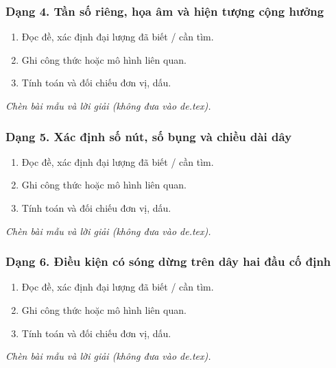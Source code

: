 \subsubsection{Dạng 4. Tần số riêng, họa âm và hiện tượng cộng hưởng}
\begin{phuongphap}
\begin{enumerate}
\item Đọc đề, xác định đại lượng đã biết / cần tìm.
\item Ghi công thức hoặc mô hình liên quan.
\item Tính toán và đối chiếu đơn vị, dấu.
\end{enumerate}
\end{phuongphap}
\begin{vidumau}
\textit{Chèn bài mẫu và lời giải (không đưa vào de.tex).}
\end{vidumau}

\subsubsection{Dạng 5. Xác định số nút, số bụng và chiều dài dây}
\begin{phuongphap}
\begin{enumerate}
\item Đọc đề, xác định đại lượng đã biết / cần tìm.
\item Ghi công thức hoặc mô hình liên quan.
\item Tính toán và đối chiếu đơn vị, dấu.
\end{enumerate}
\end{phuongphap}
\begin{vidumau}
\textit{Chèn bài mẫu và lời giải (không đưa vào de.tex).}
\end{vidumau}

\subsubsection{Dạng 6. Điều kiện có sóng dừng trên dây hai đầu cố định}
\begin{phuongphap}
\begin{enumerate}
\item Đọc đề, xác định đại lượng đã biết / cần tìm.
\item Ghi công thức hoặc mô hình liên quan.
\item Tính toán và đối chiếu đơn vị, dấu.
\end{enumerate}
\end{phuongphap}
\begin{vidumau}
\textit{Chèn bài mẫu và lời giải (không đưa vào de.tex).}
\end{vidumau}

